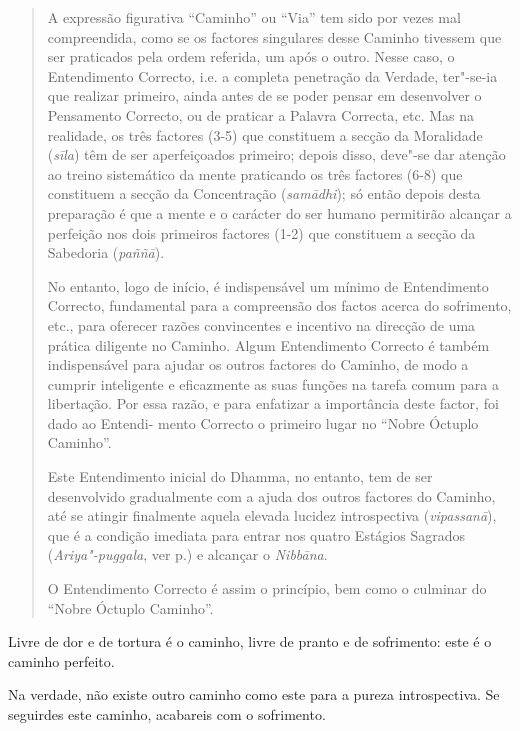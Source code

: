 \begin{quote}
  A expressão figurativa “Caminho” ou “Via” tem sido por vezes mal
  compreendida, como se os factores singulares desse Caminho tivessem que ser
  praticados pela ordem referida, um após o outro. Nesse caso, o Entendimento
  Correcto, i.e. a completa penetração da Verdade, ter"-se-ia que realizar
  primeiro, ainda antes de se poder pensar em desenvolver o Pensamento Correcto,
  ou de praticar a Palavra Correcta, etc. Mas na realidade, os três factores
  (3-5) que constituem a secção da Moralidade (\emph{sīla}) têm de ser
  aperfeiçoados primeiro; depois disso, deve"-se dar atenção ao treino
  sistemático da mente praticando os três factores (6-8) que constituem a secção
  da Concentração (\emph{samādhi}); só então depois desta preparação é que a
  mente e o carácter do ser humano permitirão alcançar a perfeição nos dois
  primeiros factores (1-2) que constituem a secção da Sabedoria (\emph{paññā}).

  No entanto, logo de início, é indispensável um mínimo de Entendimento
  Correcto, fundamental para a compreensão dos factos acerca do sofrimento,
  etc., para oferecer razões convincentes e incentivo na direcção de uma prática
  diligente no Caminho. Algum Entendimento Correcto é também indispensável para
  ajudar os outros factores do Caminho, de modo a cumprir inteligente e
  eficazmente as suas funções na tarefa comum para a libertação. Por essa razão,
  e para enfatizar a importância deste factor, foi dado ao Entendi- mento
  Correcto o primeiro lugar no “Nobre Óctuplo Caminho”.

  Este Entendimento inicial do Dhamma, no entanto, tem de ser desenvolvido
  gradualmente com a ajuda dos outros factores do Caminho, até se atingir
  finalmente aquela elevada lucidez introspectiva (\emph{vipassanā}), que é a
  condição imediata para entrar nos quatro Estágios Sagrados (\emph{Ariya"-puggala}, ver p.\pageref{ariya-puggala}) e alcançar o \emph{Nibbāna}.

  O Entendimento Correcto é assim o princípio, bem como o culminar do “Nobre Óctuplo Caminho”.
\end{quote}

\bigskip

Livre de dor e de tortura é o caminho, livre de pranto e de sofrimento: este é o
caminho perfeito.


Na verdade, não existe outro caminho como este para a pureza introspectiva. Se
seguirdes este caminho, acabareis com o sofrimento.

